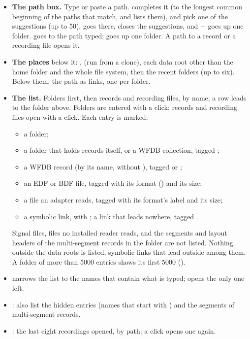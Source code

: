 \begin{itemize}
\item \textbf{The path box.} Type or paste a path.  completes it (to the longest common
  beginning of the paths that match, and lists them), \key{$\downarrow$} and \key{$\uparrow$} pick
  one of the suggestions (up to 50),  goes there,  closes the suggestions, and
  +\key{$\uparrow$} goes up one folder.  goes to the path typed; \ui{$\uparrow$} goes
  up one folder. A path to a record or a recording file opens it.
\item \textbf{The places} below it: ,  (run from a clone), each data root
  other than the home folder and the whole file system, then the recent folders (up to six).
  Below them, the path as links, one per folder.
\item \textbf{The list.} Folders first, then records and recording files, by name; a row 
  leads to the folder above. Folders are entered with a click; records and recording files open
  with a click. Each entry is marked:
  \begin{itemize}
  \item a folder;
  \item a folder that holds records itself, or a WFDB collection, tagged ;
  \item a WFDB record (by its name, without ), tagged  or
    ;
  \item an EDF or BDF file, tagged with its format () and its size;
  \item a file an adapter reads, tagged with its format's label and its size;
  \item a symbolic link, with ; a link that leads nowhere, tagged .
  \end{itemize}
  Signal files, files no installed reader reads, and the segments and layout headers of the
  multi-segment records in the folder are not listed. Nothing outside the data roots is listed,
  symbolic links that lead outside among them. A folder of more than 5000 entries shows its first
  5000 ().
\item {} narrows the list to the names that contain what is typed;
   opens the only one left.
\item {}: also list the hidden entries (names that start with ) and the segments
  of multi-segment records.
\item {}: the last eight recordings opened, by path; a click opens one again.
\end{itemize}

